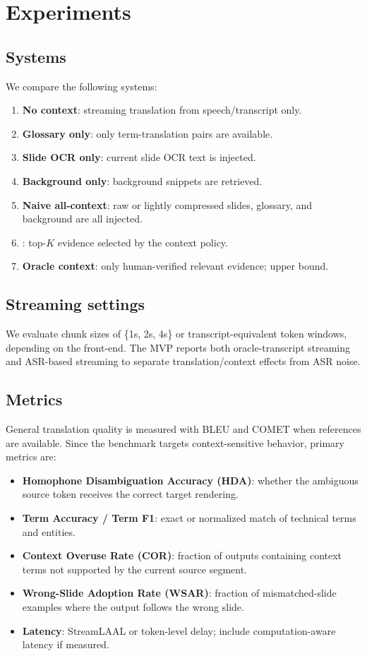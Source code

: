 \section{Experiments}

\subsection{Systems}

We compare the following systems:
\begin{enumerate}[leftmargin=*]
    \item \textbf{No context}: streaming translation from speech/transcript only.
    \item \textbf{Glossary only}: only term-translation pairs are available.
    \item \textbf{Slide OCR only}: current slide OCR text is injected.
    \item \textbf{Background only}: background snippets are retrieved.
    \item \textbf{Naive all-context}: raw or lightly compressed slides, glossary, and background are all injected.
    \item \textbf{\policyname{}}: top-$K$ evidence selected by the context policy.
    \item \textbf{Oracle context}: only human-verified relevant evidence; upper bound.
\end{enumerate}

\subsection{Streaming settings}

We evaluate chunk sizes of \{1s, 2s, 4s\} or transcript-equivalent token windows, depending on the front-end.  The MVP reports both oracle-transcript streaming and ASR-based streaming to separate translation/context effects from ASR noise.

\subsection{Metrics}

General translation quality is measured with BLEU and COMET when references are available.  Since the benchmark targets context-sensitive behavior, primary metrics are:
\begin{itemize}[leftmargin=*]
    \item \textbf{Homophone Disambiguation Accuracy (HDA)}: whether the ambiguous source token receives the correct target rendering.
    \item \textbf{Term Accuracy / Term F1}: exact or normalized match of technical terms and entities.
    \item \textbf{Context Overuse Rate (COR)}: fraction of outputs containing context terms not supported by the current source segment.
    \item \textbf{Wrong-Slide Adoption Rate (WSAR)}: fraction of mismatched-slide examples where the output follows the wrong slide.
    \item \textbf{Latency}: StreamLAAL or token-level delay; include computation-aware latency if measured.
\end{itemize}


